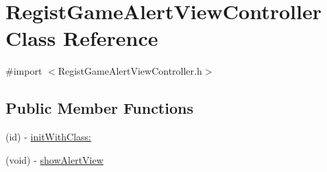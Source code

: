 \hypertarget{interface_regist_game_alert_view_controller}{
\section{RegistGameAlertViewController Class Reference}
\label{interface_regist_game_alert_view_controller}
}


{\ttfamily \#import $<$RegistGameAlertViewController.h$>$}

\subsection*{Public Member Functions}
\begin{DoxyCompactItemize}
\item 
(id) -\/ \hyperlink{interface_regist_game_alert_view_controller_ac18383840e8cb94302622ab1ab582d6f}{initWithClass:}
\item 
(void) -\/ \hyperlink{interface_regist_game_alert_view_controller_a75c0a39cf63a1e101d55ef0a2f84a022}{showAlertView}
\end{DoxyCompactItemize}
